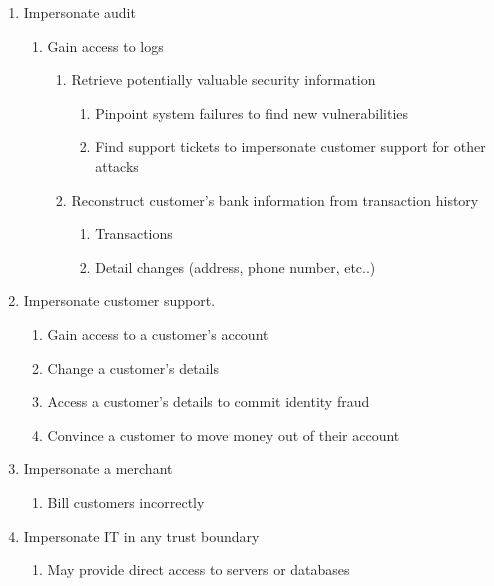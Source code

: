 \begin{enumerate}
    \item \label{impersonateAudit} Impersonate audit
    \begin{enumerate}
        \item Gain access to logs
        \begin{enumerate}
            \item Retrieve potentially valuable security information
            \begin{enumerate}
                \item Pinpoint system failures to find new vulnerabilities
                \item Find support tickets to impersonate customer support for other attacks
            \end{enumerate}

            \item Reconstruct customer’s bank information from transaction history
            \begin{enumerate}
                \item Transactions
                \item Detail changes (address, phone number, etc..)
            \end{enumerate}
        \end{enumerate}
    \end{enumerate}
    
    \item \label{impersonateCustomerSupport} Impersonate customer support.
    \begin{enumerate}
        \item Gain access to a customer's account
        \item Change a customer's details
        \item Access a customer's details to commit identity fraud
        \item Convince a customer to move money out of their account
    \end{enumerate}

    \item \label{impersonateMerchant} Impersonate a merchant
    \begin{enumerate}
        \item Bill customers incorrectly
    \end{enumerate}

    \item \label{impersonateIt} Impersonate IT in any trust boundary
    \begin{enumerate}
        \item May provide direct access to servers or databases
    \end{enumerate}


\end{enumerate}

